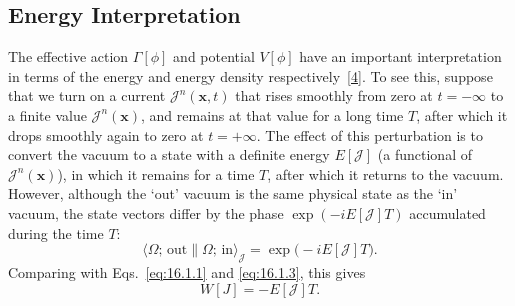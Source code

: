 \subsection{Energy Interpretation}

The effective action $\Gamma[\phi]$ and potential $V[\phi]$ have an important interpretation in terms of the energy and energy density respectively~\hyperref[ch16-ref-4]{[4]}. To see this, suppose that we turn on a current $\mathcal J^n(\mathbf{x},t)$ that rises smoothly from zero at $t=-\infty$ to a finite value $\mathcal J^n(\mathbf{x})$, and remains at that value for a long time $T$, after which it drops smoothly again to zero at $t=+\infty$. The effect of this perturbation is to convert the vacuum to a state with a definite energy $E[\mathcal J]$ (a functional of $\mathcal J^n(\mathbf{x})$), in which it remains for a time $T$, after which it returns to the vacuum. However, although the `out' vacuum is the same physical state as the `in' vacuum, the state vectors differ by the phase $\exp(-iE[\mathcal J]T)$ accumulated during the time $T$:
\begin{equation}
\langle \Omega;\,\mathrm{out}\|\Omega;\,\mathrm{in}\rangle_{\mathcal J}
=\exp\bigl(-iE[\mathcal J]T\bigr).
\tag{16.3.1}\label{eq:16.3.1}
\end{equation}
Comparing with Eqs.~\eqref{eq:16.1.1} and \eqref{eq:16.1.3}, this gives
\begin{equation}
W[J]=-E[\mathcal J]T.
\tag{16.3.2}\label{eq:16.3.2}
\end{equation}


